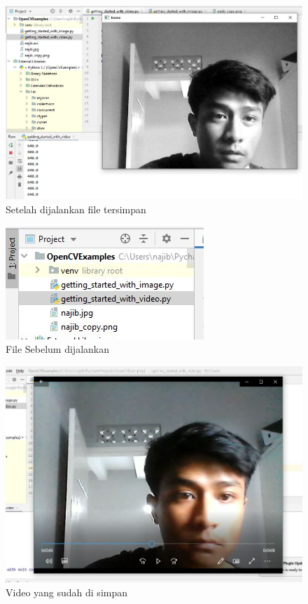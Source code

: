 \begin{figure}[ht]
\centering
\includegraphics[scale=0.5]{figures/2,7.jpg}
\caption{Setelah dijalankan file tersimpan}
\label{contoh}
\end{figure}

\newpage
\begin{figure}[ht]
\centering
\includegraphics[scale=0.5]{figures/2,7,1.jpg}
\caption{File Sebelum dijalankan}
\label{contoh}
\end{figure}

\begin{figure}[ht]
\centering
\includegraphics[scale=0.5]{figures/2,7,2.jpg}
\caption{Video yang sudah di simpan}
\label{contoh}
\end{figure}

